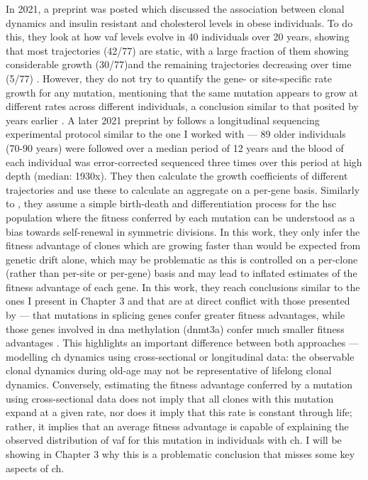 In 2021, a preprint was posted which discussed the association between clonal dynamics and insulin resistant and cholesterol levels in obese individuals. To do this, they look at how \ac{vaf} levels evolve in 40 individuals over 20 years, showing that most trajectories (42/77) are static, with a large fraction of them showing considerable growth (30/77)and the remaining trajectories decreasing over time (5/77) \cite{Van_Deuren2021-ll}. However, they do not try to quantify the gene- or site-specific rate growth for any mutation, mentioning that the same mutation appears to grow at different rates across different individuals, a conclusion similar to that posited by  years earlier \cite{Young2016-du}. A later 2021 preprint by  follows a longitudinal sequencing experimental protocol similar to the one I worked with --- 89 older individuals (70-90 years) were followed over a median period of 12 years and the blood of each individual was error-corrected sequenced three times over this period at high depth (median: 1930x). They then calculate the growth coefficients of different trajectories and use these to calculate an aggregate on a per-gene basis. Similarly to \cite{Watson2020-pz}, they assume a simple birth-death and differentiation process for the \ac{hsc} population where the fitness conferred by each mutation can be understood as a bias towards self-renewal in symmetric divisions. In this work, they only infer the fitness advantage of clones which are growing faster than would be expected from genetic drift alone, which may be problematic as this is controlled on a per-clone (rather than per-site or per-gene) basis and may lead to inflated estimates of the fitness advantage of each gene. In this work, they reach conclusions similar to the ones I present in Chapter 3 and that are at direct conflict with those presented by \cite{Watson2020-pz} --- that mutations in splicing genes confer greater fitness advantages, while those genes involved in \ac{dna} methylation (\ac{dnmt3a}) confer much smaller fitness advantages \cite{Robertson2021-sw}. This highlights an important difference between both approaches --- modelling \ac{ch} dynamics using cross-sectional or longitudinal data: the observable clonal dynamics during old-age may not be representative of lifelong clonal dynamics. Conversely, estimating the fitness advantage conferred by a mutation using cross-sectional data does not imply that all clones with this mutation expand at a given rate, nor does it imply that this rate is constant through life; rather, it implies that an average fitness advantage is capable of explaining the observed distribution of \ac{vaf} for this mutation in individuals with \ac{ch}. I will be showing in Chapter 3 why this is a problematic conclusion that misses some key aspects of \ac{ch}.

